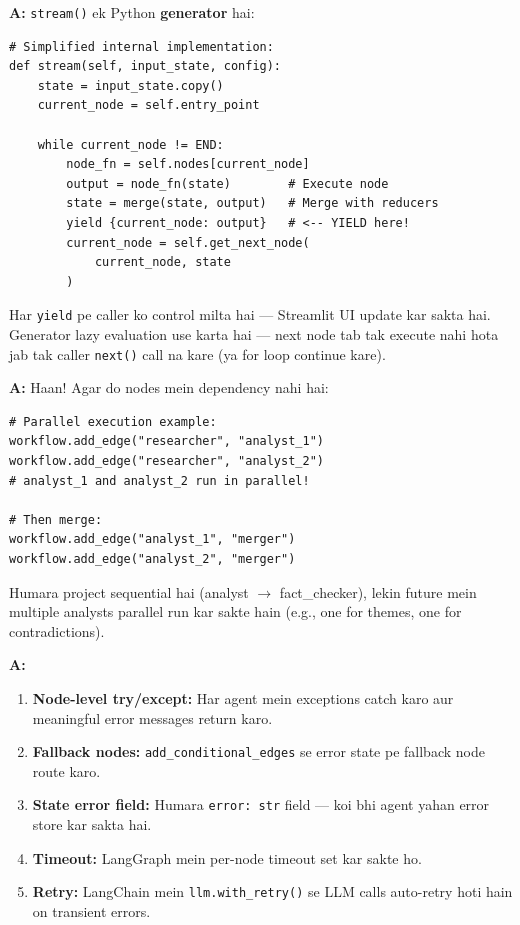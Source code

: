 \documentclass[12pt, a4paper]{article}
\begin{document}
\begin{interviewbox}[title={\faIcon{user-tie} ~Q17: \texttt{stream()} method ka internal mechanism explain karo.}]
\textbf{A:} \texttt{stream()} ek Python \textbf{generator} hai:
\begin{lstlisting}[style=pythonstyle]
# Simplified internal implementation:
def stream(self, input_state, config):
    state = input_state.copy()
    current_node = self.entry_point

    while current_node != END:
        node_fn = self.nodes[current_node]
        output = node_fn(state)        # Execute node
        state = merge(state, output)   # Merge with reducers
        yield {current_node: output}   # <-- YIELD here!
        current_node = self.get_next_node(
            current_node, state
        )
\end{lstlisting}

Har \texttt{yield} pe caller ko control milta hai --- Streamlit UI update kar sakta hai. Generator lazy evaluation use karta hai --- next node tab tak execute nahi hota jab tak caller \texttt{next()} call na kare (ya for loop continue kare).
\end{interviewbox}

\begin{interviewbox}[title={\faIcon{user-tie} ~Q18: LangGraph mein parallel execution possible hai?}]
\textbf{A:} Haan! Agar do nodes mein dependency nahi hai:
\begin{lstlisting}[style=pythonstyle]
# Parallel execution example:
workflow.add_edge("researcher", "analyst_1")
workflow.add_edge("researcher", "analyst_2")
# analyst_1 and analyst_2 run in parallel!

# Then merge:
workflow.add_edge("analyst_1", "merger")
workflow.add_edge("analyst_2", "merger")
\end{lstlisting}

Humara project sequential hai (analyst $\rightarrow$ fact\_checker), lekin future mein multiple analysts parallel run kar sakte hain (e.g., one for themes, one for contradictions).
\end{interviewbox}

\begin{interviewbox}[title={\faIcon{user-tie} ~Q19: LangGraph mein error handling best practices kya hain?}]
\textbf{A:}
\begin{enumerate}
\item \textbf{Node-level try/except:} Har agent mein exceptions catch karo aur meaningful error messages return karo.
\item \textbf{Fallback nodes:} \texttt{add\_conditional\_edges} se error state pe fallback node route karo.
\item \textbf{State error field:} Humara \texttt{error: str} field --- koi bhi agent yahan error store kar sakta hai.
\item \textbf{Timeout:} LangGraph mein per-node timeout set kar sakte ho.
\item \textbf{Retry:} LangChain mein \texttt{llm.with\_retry()} se LLM calls auto-retry hoti hain on transient errors.
\end{enumerate}
\end{interviewbox}
\end{document}

